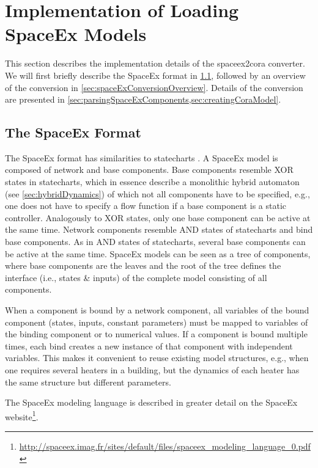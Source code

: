 \section{Implementation of Loading SpaceEx Models} \label{sx2coradocu}

This section describes the implementation details of the spaceex2cora converter. We will first briefly describe the SpaceEx format in \cref{sec:spaceExFormat}, followed by an overview of the conversion in \cref{sec:spaceExConversionOverview}. Details of the conversion are presented in \cref{sec:parsingSpaceExComponents,sec:creatingCoraModel}.

\subsection{The SpaceEx Format} \label{sec:spaceExFormat}

The SpaceEx format \cite{Cotton2010} has similarities to statecharts \cite{Harel1987}. A SpaceEx model is composed of network and base components. Base components resemble XOR states in statecharts, which in essence describe a monolithic hybrid automaton (see \cref{sec:hybridDynamics}) of which not all components have to be specified, e.g., one does not have to specify a flow function if a base component is a static controller. Analogously to XOR states, only one base component can be active at the same time. Network components resemble AND states of statecharts and bind base components. As in AND states of statecharts, several base components can be active at the same time. SpaceEx models can be seen as a tree of components, where base components are the leaves and the root of the tree defines the interface (i.e., states \& inputs) of the complete model consisting of all components.

When a component is bound by a network component, all variables of the bound component (states, inputs, constant parameters) must be mapped to variables of the binding component or to numerical values. If a component is bound multiple times, each bind creates a new instance of that component with independent variables. This makes it convenient to reuse existing model structures, e.g., when one requires several heaters in a building, but the dynamics of each heater has the same structure but different parameters.

The SpaceEx modeling language is described in greater detail on the SpaceEx website\footnote{\href{http://spaceex.imag.fr/sites/default/files/spaceex\_modeling\_language\_0.pdf}{http://spaceex.imag.fr/sites/default/files/spaceex\_modeling\_language\_0.pdf}}.

